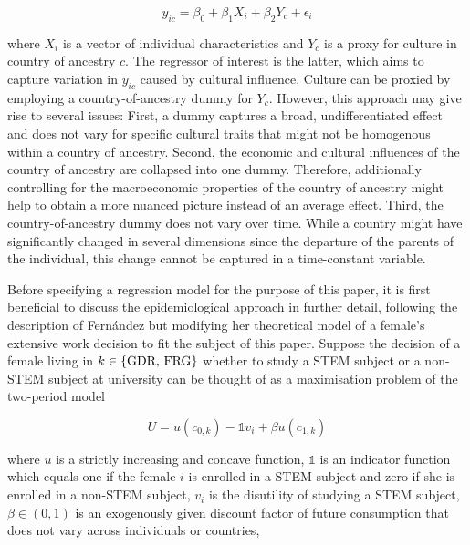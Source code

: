 \documentclass[a4paper, oneside, hyperfootnotes = false]{article}
\begin{document}
{\vspace{-8mm}

\begin{equation}
	\label{eq:fernandezexercise}
	y_{ic} = \beta_{0} + \beta_{1}X_{i} + \beta_{2}Y_{c} + \epsilon_{i}
\end{equation}

\noindent where $X_{i}$ is a vector of individual characteristics and $Y_{c}$ is a proxy for culture in country of ancestry $c$.
The regressor of interest is the latter, which aims to capture variation in $y_{ic}$ caused by cultural influence.
Culture can be proxied by employing a country-of-ancestry dummy for $Y_{c}$.
However, this approach may give rise to several issues:
First, a dummy captures a broad, undifferentiated effect and does not vary for specific cultural traits that might not be homogenous within a country of ancestry.
Second, the economic and cultural influences of the country of ancestry are collapsed into one dummy.
Therefore, additionally controlling for the macroeconomic properties of the country of ancestry might help to obtain a more nuanced picture instead of an average effect.
Third, the country-of-ancestry dummy does not vary over time.
While a country might have significantly changed in several dimensions since the departure of the parents of the individual, this change cannot be captured in a time-constant variable.

Before specifying a regression model for the purpose of this paper, it is first  beneficial to discuss the epidemiological approach in further detail, following the description of Fernández but modifying her theoretical model of a female's extensive work decision to fit the subject of this paper.
Suppose the decision of a female living in $k \in \{\textnormal{GDR, FRG}\}$ whether to study a STEM subject or a non-STEM subject at university can be thought of as a maximisation problem of the two-period model

\vspace{-8mm}

\begin{equation}
	\label{eq:utility}
	U = u(c_{0,k}) - \mathds{1}v_{i} + \beta{}u(c_{1,k})
\end{equation}

\noindent where $u$ is a strictly increasing and concave function, $\mathds{1}$ is an indicator function which equals one if the female $i$ is enrolled in a STEM subject and zero if she is enrolled in a non-STEM subject, $v_{i}$ is the disutility of studying a STEM subject, $\beta \in (0,1)$ is an exogenously given discount factor of future consumption that does not vary across individuals or countries,

}
\end{document}

